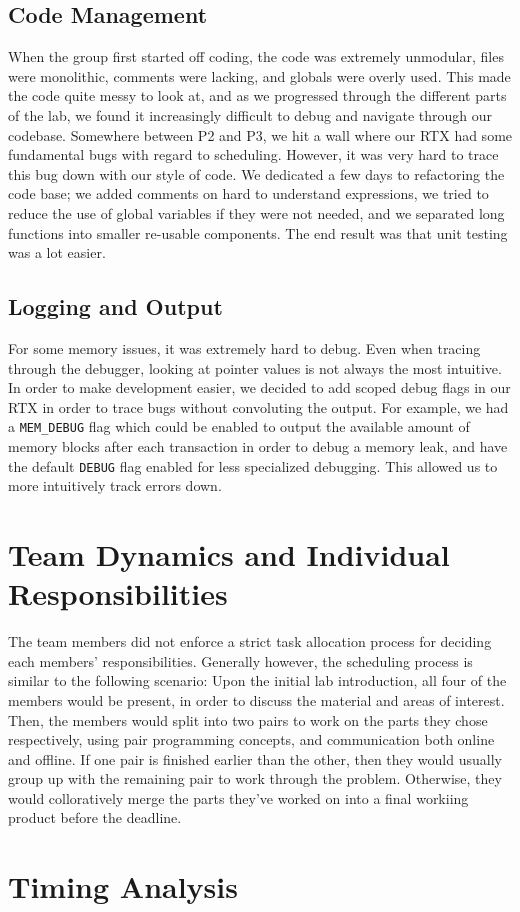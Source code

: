 \documentclass[12pt]{report}
\begin{document}
\section{Code Management}
When the group first started off coding, the code was extremely unmodular, files were monolithic, comments were lacking, and globals were overly used. This made the code quite messy to look at, and as we progressed through the different parts of the lab, we found it increasingly difficult to debug and navigate through our codebase. Somewhere between P2 and P3, we hit a wall where our RTX had some fundamental bugs with regard to scheduling. However, it was very hard to trace this bug down with our style of code. We dedicated a few days to refactoring the code base; we added comments on hard to understand expressions, we tried to reduce the use of global variables if they were not needed, and we separated long functions into smaller re-usable components. The end result was that unit testing was a lot easier.

\section{Logging and Output}
For some memory issues, it was extremely hard to debug. Even when tracing through the debugger, looking at pointer values is not always the most intuitive. In order to make development easier, we decided to add scoped debug flags in our RTX in order to trace bugs without convoluting the output. For example, we had a \texttt{MEM_DEBUG} flag which could be enabled to output the available amount of memory blocks after each transaction in order to debug a memory leak, and have the default \texttt{DEBUG} flag enabled for less specialized debugging. This allowed us to more intuitively track errors down.

\chapter{Team Dynamics and Individual Responsibilities}
The team members did not enforce a strict task allocation process for deciding each members' responsibilities. Generally however, the scheduling process is similar to the following scenario:
Upon the initial lab introduction, all four of the members would be present, in order to discuss the material and areas of interest. Then, the members would split into two pairs to work on the parts they chose respectively, using pair programming concepts, and communication both online and offline. If one pair is finished earlier than the other, then they would usually group up with the remaining pair to work through the problem. Otherwise, they would colloratively merge the parts they've worked on into a final workiing product before the deadline.

\chapter{Timing Analysis}
\end{document}
